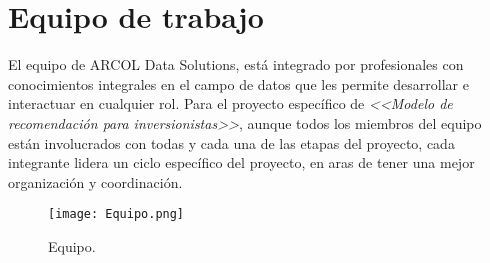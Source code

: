 \documentclass[12pt]{article}
\begin{document}
\section{Equipo de trabajo}

El equipo de ARCOL Data Solutions, está integrado por profesionales con conocimientos integrales en el campo de datos que les permite desarrollar e interactuar en cualquier rol. Para el proyecto específico de \textit{<<Modelo de recomendación para inversionistas>>}, aunque todos los miembros del equipo están involucrados con todas y cada una de las etapas del proyecto, cada integrante lidera un ciclo específico del proyecto, en aras de tener una mejor organización y coordinación. 

\begin{figure}[H]
  \centering
  \texttt{[image: Equipo.png]}
  \caption{Equipo.}
  \label{fig:Equipo ARCOL Solutions}
\end{figure}
\end{document}
